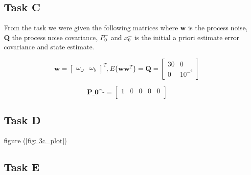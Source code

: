 \subsection{Task C}
From the task we were given the following matrices where \textbf{w} is the process noise, \textbf{Q} the process noise covariance, \textbf{$P_0^-$} and \textbf{$x_0^-$} is the initial a priori estimate error covariance and state estimate. 

\begin{equation}
    \textbf{w} =
    \begin{bmatrix}
        \omega_\omega & \omega_b
    \end{bmatrix}^T , 
    E\{\textbf{w}\textbf{w}^T\} = \textbf{Q} =
    \begin{bmatrix}
        30 & 0 \\
        0 & 10^-^6       \nonumber
    \end{bmatrix}
\end{equation}

\begin{equation}
    \textbf{P_0^-} =
    \begin{bmatrix}
        1 & 0 & 0 & 0 & 0 \\
        
    \end{bmatrix}
\end{equation}


\subsection{Task D}
figure (\ref{fig: 3c_plot})


\subsection{Task E}

